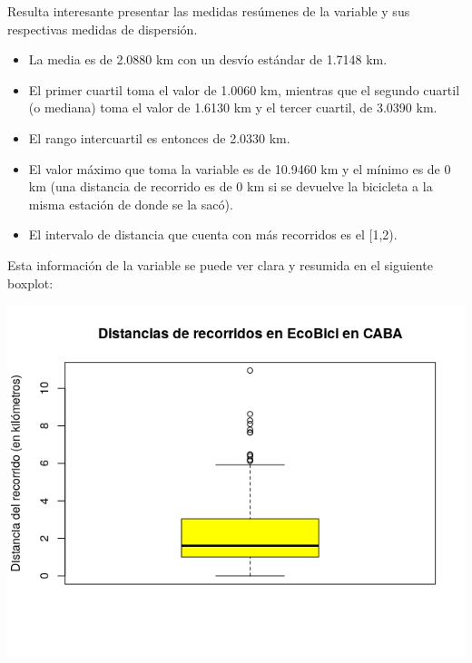 \documentclass[11pt]{article}
\begin{document}
    Resulta interesante presentar las medidas res\'umenes de la variable y sus respectivas medidas de dispersi\'on.

    \begin{itemize}
      \item La media es de 2.0880 km con un desv\'io est\'andar de 1.7148 km.
      \item El primer cuartil toma el valor de 1.0060 km, mientras que el segundo cuartil (o mediana)
      toma el valor de 1.6130 km y el tercer cuartil, de 3.0390 km.
      \item El rango intercuartil es entonces de 2.0330 km. 
      \item El valor m\'aximo que toma la variable es de 10.9460 km y el m\'inimo es de 0 km (una distancia de recorrido es de 0 km si se devuelve la bicicleta a la misma estaci\'on de donde se la sac\'o).
      \item El intervalo de distancia que cuenta con m\'as recorridos es el [1,2).
    \end{itemize}

    Esta informaci\'on de la variable se puede ver clara y resumida en el siguiente boxplot: 

    \begin{center}
      \includegraphics[scale=0.7]{BoxPlotDist.png}
    \end{center}

    \vspace{-1.5cm}
\end{document}
